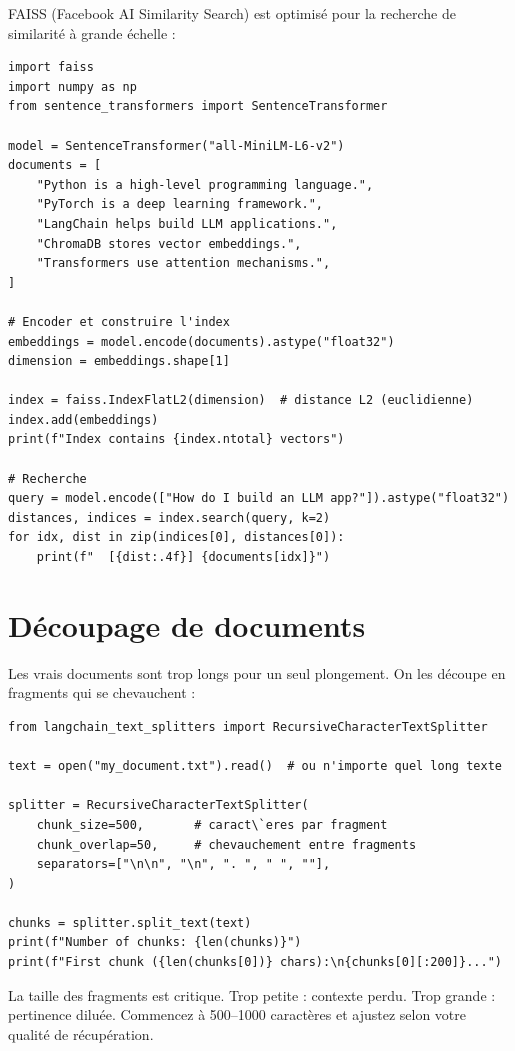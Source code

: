 FAISS (Facebook AI Similarity Search) est optimis\'e pour la recherche de similarit\'e \`a grande \'echelle :

\begin{verbatim}
import faiss
import numpy as np
from sentence_transformers import SentenceTransformer

model = SentenceTransformer("all-MiniLM-L6-v2")
documents = [
    "Python is a high-level programming language.",
    "PyTorch is a deep learning framework.",
    "LangChain helps build LLM applications.",
    "ChromaDB stores vector embeddings.",
    "Transformers use attention mechanisms.",
]

# Encoder et construire l'index
embeddings = model.encode(documents).astype("float32")
dimension = embeddings.shape[1]

index = faiss.IndexFlatL2(dimension)  # distance L2 (euclidienne)
index.add(embeddings)
print(f"Index contains {index.ntotal} vectors")

# Recherche
query = model.encode(["How do I build an LLM app?"]).astype("float32")
distances, indices = index.search(query, k=2)
for idx, dist in zip(indices[0], distances[0]):
    print(f"  [{dist:.4f}] {documents[idx]}")
\end{verbatim}

\section{D\'ecoupage de documents}

Les vrais documents sont trop longs pour un seul plongement. On les d\'ecoupe en fragments qui se chevauchent :

\begin{verbatim}
from langchain_text_splitters import RecursiveCharacterTextSplitter

text = open("my_document.txt").read()  # ou n'importe quel long texte

splitter = RecursiveCharacterTextSplitter(
    chunk_size=500,       # caract\`eres par fragment
    chunk_overlap=50,     # chevauchement entre fragments
    separators=["\n\n", "\n", ". ", " ", ""],
)

chunks = splitter.split_text(text)
print(f"Number of chunks: {len(chunks)}")
print(f"First chunk ({len(chunks[0])} chars):\n{chunks[0][:200]}...")
\end{verbatim}

\begin{warningbox}
La taille des fragments est critique. Trop petite : contexte perdu. Trop grande : pertinence dilu\'ee. Commencez \`a 500--1000 caract\`eres et ajustez selon votre qualit\'e de r\'ecup\'eration.
\end{warningbox}


